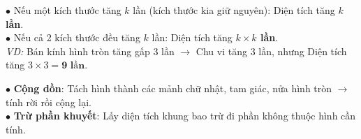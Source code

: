 \documentclass[14pt,a4paper,oneside]{extbook}
\begin{document}
\vspace{3mm}

\noindent
\begin{minipage}[t]{0.52\textwidth}
  \begin{tcolorbox}[
    enhanced,
    title={\footnotesize\bfseries\color{white}\faSliders\ 2. Quy luật tỉ lệ kích thước và diện tích},
    colback=teal!2!white,
    colframe=teal!75!black,
    arc=2.5mm, boxrule=0.8pt, top=1.8mm, bottom=1.8mm, left=2.2mm, right=2.2mm
  ]
    \footnotesize
    $\bullet$ Nếu một kích thước tăng $k$ lần (kích thước kia giữ nguyên): Diện tích tăng \textbf{$k$ lần}.\\
    $\bullet$ Nếu cả 2 kích thước đều tăng $k$ lần: Diện tích tăng \textbf{$k \times k$ lần}.\\
    \textit{VD:} Bán kính hình tròn tăng gấp $3$ lần $\rightarrow$ Chu vi tăng $3$ lần, nhưng Diện tích tăng $3 \times 3 = \mathbf{9\text{ lần}}$.
  \end{tcolorbox}
\end{minipage}%
\hfill
\begin{minipage}[t]{0.46\textwidth}
  \begin{tcolorbox}[
    enhanced,
    title={\footnotesize\bfseries\color{white}\faCheckSquareO\ 3. Phương pháp giải hình phức hợp},
    colback=purple!2!white,
    colframe=purple!70!black,
    arc=2.5mm, boxrule=0.8pt, top=1.8mm, bottom=1.8mm, left=2mm, right=2mm
  ]
    \footnotesize
    $\bullet$ \textbf{Cộng dồn}: Tách hình thành các mảnh chữ nhật, tam giác, nửa hình tròn $\rightarrow$ tính rời rồi cộng lại.\\
    $\bullet$ \textbf{Trừ phần khuyết}: Lấy diện tích khung bao trừ đi phần không thuộc hình cần tính.
  \end{tcolorbox}
\end{minipage}

\vspace{3mm}
\end{document}
